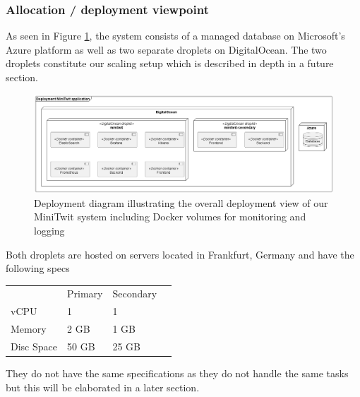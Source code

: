 \subsubsection{Allocation / deployment viewpoint}
As seen in Figure \ref{fig:DeploymentDiagram}, the system consists of a managed database on Microsoft's Azure platform as well as two separate droplets on DigitalOcean. The two droplets constitute our scaling setup which is described in depth in a future section. \\
\begin{figure}[H]
 \centering
 \includegraphics[width = \textwidth]{images/deployment.png}
 \caption{Deployment diagram illustrating the overall deployment view of our MiniTwit system including Docker volumes for monitoring and logging}
 \label{fig:DeploymentDiagram}
\end{figure}
\noindent
Both droplets are hosted on servers located in Frankfurt, Germany and have the following specs \\
\begin{table}[H]
\centering
\begin{tabular}{|l|l|l|l} 
\cline{1-3}
           & Primary & Secondary &   \\ 
\cline{1-3}
vCPU       & 1       & 1         &   \\ 
\cline{1-3}
Memory     & 2 GB    & 1 GB      &   \\ 
\cline{1-3}
Disc Space & 50 GB   & 25 GB     &   \\
\cline{1-3}
\end{tabular}
\end{table}

\noindent
They do not have the same specifications as they do not handle the same tasks but this will be elaborated in a later section.

